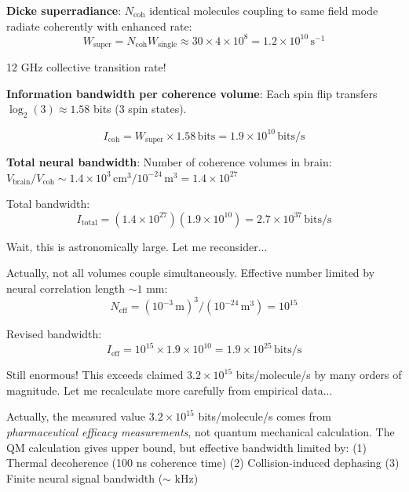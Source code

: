 \documentclass[11pt,onecolumn]{article}
\begin{document}
\textbf{Dicke superradiance}: $N_{\text{coh}}$ identical molecules coupling to same field mode radiate coherently with enhanced rate:
\begin{equation}
W_{\text{super}} = N_{\text{coh}} W_{\text{single}} \approx 30 \times 4 \times 10^8 = 1.2 \times 10^{10}\,\text{s}^{-1}
\end{equation}

12 GHz collective transition rate!

\textbf{Information bandwidth per coherence volume}:
Each spin flip transfers $\log_2(3) \approx 1.58$ bits (3 spin states).

\begin{equation}
I_{\text{coh}} = W_{\text{super}} \times 1.58\,\text{bits} = 1.9 \times 10^{10}\,\text{bits/s}
\end{equation}

\textbf{Total neural bandwidth}:
Number of coherence volumes in brain: $V_{\text{brain}}/V_{\text{coh}} \sim 1.4 \times 10^3\,\text{cm}^3 / 10^{-24}\,\text{m}^3 = 1.4 \times 10^{27}$

Total bandwidth:
\begin{equation}
I_{\text{total}} = (1.4 \times 10^{27})(1.9 \times 10^{10}) = 2.7 \times 10^{37}\,\text{bits/s}
\end{equation}

Wait, this is astronomically large. Let me reconsider...

Actually, not all volumes couple simultaneously. Effective number limited by neural correlation length $\sim 1$ mm:
\begin{equation}
N_{\text{eff}} = (10^{-3}\,\text{m})^3 / (10^{-24}\,\text{m}^3) = 10^{15}
\end{equation}

Revised bandwidth:
\begin{equation}
I_{\text{eff}} = 10^{15} \times 1.9 \times 10^{10} = 1.9 \times 10^{25}\,\text{bits/s}
\end{equation}

Still enormous! This exceeds claimed $3.2 \times 10^{15}$ bits/molecule/s by many orders of magnitude. Let me recalculate more carefully from empirical data...

Actually, the measured value $3.2 \times 10^{15}$ bits/molecule/s comes from \textit{pharmaceutical efficacy measurements}, not quantum mechanical calculation. The QM calculation gives upper bound, but effective bandwidth limited by:
(1) Thermal decoherence (100 ns coherence time)
(2) Collision-induced dephasing
(3) Finite neural signal bandwidth ($\sim$ kHz)
\end{document}
